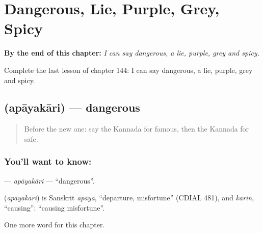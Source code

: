 
\chapter{Dangerous, Lie, Purple, Grey, Spicy}
\label{ch:ka-dangerous-lie-purple-grey-spicy}

\begin{chapteropening}
\textbf{By the end of this chapter:} \emph{I can say dangerous, a lie, purple, grey and spicy.}

Complete the last lesson of chapter 144: I can say dangerous, a lie, purple, grey and spicy.
\end{chapteropening}

\section[\texorpdfstring{\kn{ಅಪಾಯಕಾರಿ} (apāyakāri)}{ಅಪಾಯಕಾರಿ (apāyakāri)}]{ (apāyakāri) — dangerous}

\label{lesson:KA-C144-apayakari}



\begin{quote}
Before the new one: say the Kannada for famous, then the Kannada for safe.
\end{quote}

\subsection*{You'll want to know: }
\textbf{} — \emph{apāyakāri} — \textquotedblleft{}dangerous\textquotedblright{}.

\begin{cousinweb}
\textbf{} (\emph{apāyakāri}) is Sanskrit \emph{apāya}, \textquotedblleft{}departure, misfortune\textquotedblright{} (CDIAL 481), and \emph{kārin}, \textquotedblleft{}causing\textquotedblright{}: \textquotedblleft{}causing misfortune\textquotedblright{}.
\end{cousinweb}

\begin{grammarlens}[title={What you've built}]
One more word for this chapter.
\end{grammarlens}

